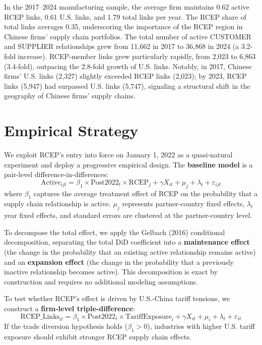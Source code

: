 \documentclass[preprint,12pt,authoryear]{elsarticle}
\begin{document}
In the 2017--2024 manufacturing sample, the average firm maintains 0.62 active RCEP links, 0.61 U.S. links, and 1.79 total links per year. The RCEP share of total links averages 0.35, underscoring the importance of the RCEP region in Chinese firms' supply chain portfolios. The total number of active CUSTOMER and SUPPLIER relationships grew from 11,662 in 2017 to 36,868 in 2024 (a 3.2-fold increase). RCEP-member links grew particularly rapidly, from 2,023 to 6,863 (3.4-fold), outpacing the 2.8-fold growth of U.S. links. Notably, in 2017, Chinese firms' U.S. links (2,327) slightly exceeded RCEP links (2,023); by 2023, RCEP links (5,947) had surpassed U.S. links (5,747), signaling a structural shift in the geography of Chinese firms' supply chains.

\section{Empirical Strategy}
\label{sec:strategy}

We exploit RCEP's entry into force on January 1, 2022 as a quasi-natural experiment and deploy a progressive empirical design. The \textbf{baseline model} is a pair-level difference-in-differences:
\begin{equation}\label{eq:did}
\text{Active}_{ijt} = \beta_1 \times \text{Post2022}_t \times \text{RCEP}_j + \gamma X_{it} + \mu_j + \lambda_t + \varepsilon_{ijt}
\end{equation}
where $\beta_1$ captures the average treatment effect of RCEP on the probability that a supply chain relationship is active. $\mu_j$ represents partner-country fixed effects, $\lambda_t$ year fixed effects, and standard errors are clustered at the partner-country level.

To decompose the total effect, we apply the Gelbach (2016) conditional decomposition, separating the total DiD coefficient into a \textbf{maintenance effect} (the change in the probability that an existing active relationship remains active) and an \textbf{expansion effect} (the change in the probability that a previously inactive relationship becomes active). This decomposition is exact by construction and requires no additional modeling assumptions.

To test whether RCEP's effect is driven by U.S.-China tariff tensions, we construct a \textbf{firm-level triple-difference}:
\begin{equation}\label{eq:ddd}
\text{RCEP\_Links}_{it} = \beta_1 \times \text{Post2022}_t \times \text{TariffExposure}_i + \gamma X_{it} + \mu_i + \lambda_t + \varepsilon_{it}
\end{equation}
If the trade diversion hypothesis holds ($\beta_1 > 0$), industries with higher U.S. tariff exposure should exhibit stronger RCEP supply chain effects.
\end{document}
